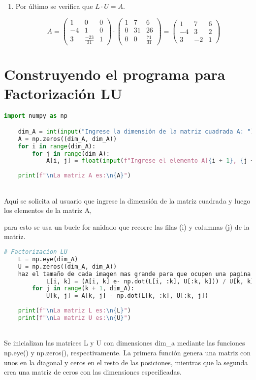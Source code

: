 \documentclass[letterpaper,12pt]{article}
\begin{document}
\begin{enumerate}
    
    \item Por último se verifica que  $L\cdot U = A$.

\[
A = \begin{pmatrix}
    1 & 0 & 0 \\
    -4 & 1 & 0 \\
    3 & \frac{-23}{31} & 1
    \end{pmatrix}
    \cdot
    \begin{pmatrix}
    1 & 7 & 6 \\
    0 & 31 & 26 \\
    0 & 0 & \frac{71}{31}
    \end{pmatrix}
    =
    \begin{pmatrix}
    1 & 7 & 6 \\
    -4 & 3 & 2 \\
    3 & -2 & 1
    \end{pmatrix}
\]
    
\end{enumerate}

\section*{Construyendo el programa para Factorización LU}
\begin{lstlisting}[style=jupyter, language=Python, caption={Construyendo la Matriz A}]
    import numpy as np

    dim_A = int(input("Ingrese la dimensión de la matriz cuadrada A: "))
    A = np.zeros((dim_A, dim_A))
    for i in range(dim_A):
        for j in range(dim_A):
            A[i, j] = float(input(f"Ingrese el elemento A[{i + 1}, {j + 1}]: "))
    
    print(f"\nLa matriz A es:\n{A}")
\end{lstlisting}
\\
Aquí se solicita al usuario que ingrese la dimensión de la matriz cuadrada y luego los elementos de la matriz A, 

para esto se usa un bucle for anidado que recorre las filas (i) y columnas (j) de la matriz.
\\
\begin{lstlisting}[style=jupyter, language=Python, caption={Factorizando}]
    # Factorizacion LU
    L = np.eye(dim_A)
    U = np.zeros((dim_A, dim_A))
    haz el tamaño de cada imagen mas grande para que ocupen una pagina completa_A):
            L[i, k] = (A[i, k] e- np.dot(L[i, :k], U[:k, k])) / U[k, k]
        for j in range(k + 1, dim_A):
            U[k, j] = A[k, j] - np.dot(L[k, :k], U[:k, j])
    
    print(f"\nLa matriz L es:\n{L}")
    print(f"\nLa matriz U es:\n{U}")
\end{lstlisting}
\\
Se inicializan las matrices L y U con dimensiones \textcolor{jl_keyword}{dim\_a} mediante las funciones \textcolor{jl_keyword}{np.eye()} y \textcolor{jl_keyword}{np.zeros()}, respectivamente. La primera función genera una matriz con unos en la diagonal y ceros en el resto de las posiciones, mientras que la segunda crea una matriz de ceros con las dimensiones especificadas.
\end{document}
